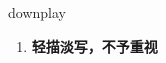 
\begin{frame}
{\huge downplay}
\begin{center}
\begin{enumerate}\Large
  \item \textbf{轻描淡写，不予重视}
\end{enumerate}
\end{center}
\end{frame}
